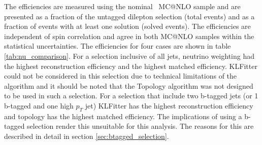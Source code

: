 The efficiencies are measured using the nominal \ttbar\ MC@NLO sample and are presented as a fraction of the untagged dilepton selection (total events) and as a fraction of events with at least one solution (solved events). The efficiencies are independent of spin correlation and agree in both MC@NLO samples within the statistical uncertainties. The efficiencies for four cases are shown in table \ref{tab:nu_comparison}. For a selection inclusive of all jets, neutrino weighting had the highest reconstruction efficiency and the highest matched efficiency. KLFitter could not be considered in this selection due to technical limitations of the algorithm and it should be noted that the Topology algorithm was not designed to be used in such a selection. For a selection that include two b-tagged jets (or 1 b-tagged and one high $p_T$ jet) KLFitter has the highest reconstruction efficiency and topology has the highest matched efficiency. The implications of using a b-tagged selection render this unsuitable for this analysis. The reasons for this are described in detail in section \ref{sec:btagged_selection}.
